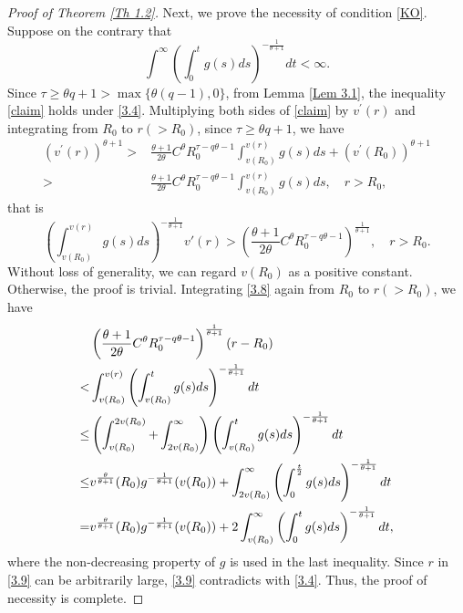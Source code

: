 \documentclass[a4paper,11pt]{amsart}
\theoremstyle{plain}
\theoremstyle{remark}
\numberwithin{equation}{section}
\numberwithin{figure}{section}
\numberwithin{remark}{section}
\begin{document}
\begin{sloppypar}
\begin{proof}[Proof of Theorem \ref{Th 1.2}]
Next, we prove the necessity of condition \eqref{KO}. Suppose on the contrary that
\begin{equation}\label{3.4}
	\int^{\infty}\left( \int_{0}^{t}g(s)ds\right)^{-\frac{1}{\theta+1}}dt<\infty.
\end{equation}
Since $\tau \ge \theta q+1 > \max \{\theta (q-1), 0\}$, from Lemma \ref{Lem 3.1}, the inequality \eqref{claim} holds under \eqref{3.4}. Multiplying both sides of \eqref{claim} by $v^\prime(r)$ and integrating from $R_0$ to $r (>R_0)$, since $\tau \ge \theta q+1$, we have
\begin{align*}
	(v^\prime(r) )^{\theta+1}>&\frac{\theta +1}{2\theta} C^\theta R_0^{\tau -q\theta -1} \int_{v(R_0)}^{v(r)}  g(s)ds + (v^\prime(R_0) )^{\theta+1}\\
	>&\frac{\theta +1}{2\theta} C^\theta R_0^{\tau -q\theta -1} \int_{v(R_0)}^{v(r)}  g(s)ds, \quad r>R_0,
\end{align*}
that is
\begin{equation}\label{3.8}
	\left( \int_{v(R_0)}^{v(r)}g(s)ds\right)^{-\frac{1}{\theta+1}} v'(r)>\left( \frac{\theta +1}{2\theta} C^\theta R_0^{\tau -q\theta -1} \right)^\frac{1}{\theta+1}, \quad r>R_0.
\end{equation} 
Without loss of generality, we can regard $v(R_0)$ as a positive constant. Otherwise, the proof is trivial. 
Integrating \eqref{3.8} again from $R_0$ to $r(>R_0)$, we have
\begin{align}
		& \left( \frac{\theta +1}{2\theta} C^\theta R_0^{\tau -q\theta -1} \right)^\frac{1}{\theta+1} (r-R_0) \notag\\
		< & \int_{v(R_0)}^{v(r)}\left( \int_{v(R_0)}^{t}g(s)ds\right)^{-\frac{1}{\theta+1}}dt \notag\\
		 \le & \left(\int_{v(R_0)}^{2v(R_0)} + \int_{2v(R_0)}^{\infty} \right)\left( \int_{v(R_0)}^{t}g(s)ds\right) ^{-\frac{1}{\theta+1}}dt \label{3.9}\\
		 \le & v^{\frac{\theta}{\theta+1}}(R_0) g^{-\frac{1}{\theta+1}}(v(R_0))+ \int_{2v(R_0)}^{\infty}\left( \int_{0}^{\frac{t}{2}}g(s)ds\right) ^{-\frac{1}{\theta+1}}dt \notag \\
		 = & v^{\frac{\theta}{\theta+1}}(R_0) g^{-\frac{1}{\theta+1}}(v(R_0)) + 2 \int_{v(R_0)}^{\infty}\left( \int_{0}^{t}g(s)ds\right) ^{-\frac{1}{\theta+1}}dt,\notag
\end{align}
where the non-decreasing property of $g$ is used in the last inequality.
Since $r$ in \eqref{3.9} can be arbitrarily large, \eqref{3.9} contradicts with \eqref{3.4}. Thus, the proof of necessity is complete.
\end{proof}


\end{sloppypar}
\end{document}
